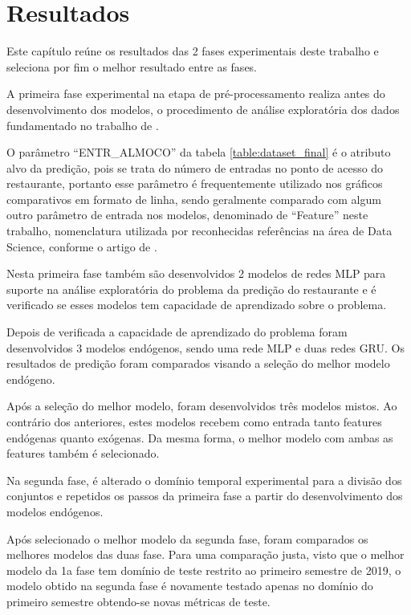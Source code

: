 \chapter{Resultados} \label{cap:resultados}
    Este capítulo reúne os resultados das 2 fases experimentais deste trabalho e seleciona por fim o melhor resultado entre as fases.
    
    A primeira fase experimental na etapa de pré-processamento realiza antes do desenvolvimento dos modelos, o procedimento de análise exploratória dos dados fundamentado no trabalho de \cite{Junior2007}.
    
    O parâmetro ``ENTR\_ALMOCO'' da tabela \ref{table:dataset_final} é o atributo alvo da predição, pois se trata do número de entradas no ponto de acesso do restaurante, portanto esse parâmetro é frequentemente utilizado nos gráficos comparativos em formato de linha, sendo geralmente comparado com algum outro parâmetro de entrada nos modelos, denominado de ``Feature'' neste trabalho, nomenclatura utilizada por reconhecidas referências na área de Data Science, conforme o artigo de \cite{TWDSFeatures}.
    
    Nesta primeira fase também são desenvolvidos 2 modelos de redes MLP para suporte na análise exploratória do problema da predição do restaurante e é verificado se esses modelos tem capacidade de aprendizado sobre o problema.
    
    Depois de verificada a capacidade de aprendizado do problema foram desenvolvidos 3 modelos endógenos, sendo uma rede MLP e duas redes GRU. Os resultados de predição foram comparados visando a seleção do melhor modelo endógeno.
    
    Após a seleção do melhor modelo, foram desenvolvidos três modelos mistos. Ao contrário dos anteriores, estes modelos recebem como entrada tanto features endógenas quanto exógenas. Da mesma forma, o melhor modelo com ambas as features também é selecionado.
    
    
    Na segunda fase, é alterado o domínio temporal experimental para a divisão dos conjuntos e repetidos os passos da primeira fase a partir do desenvolvimento dos modelos endógenos.
    
    Após selecionado o melhor modelo da segunda fase, foram comparados os melhores modelos das duas fase. Para uma comparação justa, visto que o melhor modelo da 1a fase tem domínio de teste restrito ao primeiro semestre de 2019, o modelo obtido na segunda fase é novamente testado apenas no domínio do primeiro semestre obtendo-se novas métricas de teste.
    

